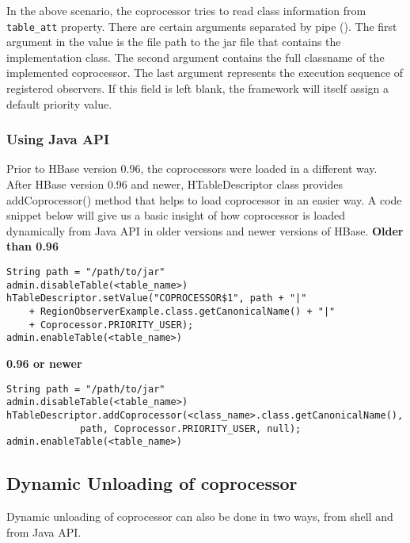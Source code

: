 \documentclass[11pt,a4paper,bibtotoc,idxtotoc,headsepline,footsepline,footexclude,BCOR12mm,DIV13]{scrbook}
\begin{document}
In the above scenario, the coprocessor tries to read class information from \texttt{table\_att} property. There are certain arguments separated by pipe (\text{\textbar}). The first argument in the value is the file path to the jar file that contains the implementation class. The second argument contains the full classname of the implemented coprocessor. The last argument represents the execution sequence of registered observers. If this field is left blank, the framework will itself assign a default priority value\cite{hbase:site}.

\subsubsection{Using Java API}
Prior to HBase version 0.96, the coprocessors were loaded in a different way. After HBase version 0.96 and newer, HTableDescriptor class provides addCoprocessor() method that helps to load coprocessor in an easier way. A code snippet\cite{loading:coprocessors} below will give us a basic insight of how coprocessor is loaded dynamically from Java API in older versions and newer versions of HBase.
\newline \newline
\textbf{Older than 0.96} \newline
\lstset{language=Java}
\begin{lstlisting}
String path = "/path/to/jar"
admin.disableTable(<table_name>)
hTableDescriptor.setValue("COPROCESSOR$1", path + "|"
	+ RegionObserverExample.class.getCanonicalName() + "|"
	+ Coprocessor.PRIORITY_USER);
admin.enableTable(<table_name>)
\end{lstlisting}

\textbf{0.96 or newer} \newline
\lstset{language=Java}
\begin{lstlisting}
String path = "/path/to/jar"
admin.disableTable(<table_name>)
hTableDescriptor.addCoprocessor(<class_name>.class.getCanonicalName(),
			 path, Coprocessor.PRIORITY_USER, null);
admin.enableTable(<table_name>)
\end{lstlisting}

\subsection{Dynamic Unloading of coprocessor}
Dynamic unloading of coprocessor can also be done in two ways, from shell and from Java API. 
\end{document}
